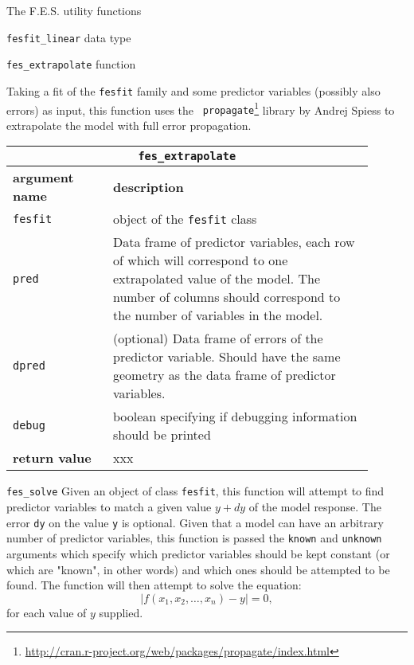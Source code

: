 \documentclass[10pt,a4paper]{article}
\begin{document}
\begin{section}{The F.E.S. utility functions}
\begin{subsection}{ {\tt fesfit\_linear} data type }
\end{subsection}

\begin{subsection}{ {\tt fes\_extrapolate} function }

Taking a fit of the {\tt fesfit} family and some predictor variables (possibly
also errors) as input, this function uses the {\tt
propagate}\footnote{\url{
http://cran.r-project.org/web/packages/propagate/index.html}} library by Andrej
Spiess to extrapolate the model with full error propagation.

{ \centering
\begin{tabular}{|p{0.25\linewidth}|p{0.65\linewidth}|}
\hline
\multicolumn{2}{|c|}{ {\tt fes\_extrapolate} } \\
\hline \hline \textbf{argument name} & \textbf{description} \\
\hline {\tt fesfit} & object of the {\tt fesfit} class \\ 
{\tt pred} & Data frame of predictor variables, each row of which will
correspond to one extrapolated value of the model. The number of columns should
correspond to the number of variables in the model. \\ 
{\tt dpred} & (optional) Data frame of errors of the predictor variable. Should
have the same geometry as the data frame of predictor variables. \\ 
{\tt debug} & boolean specifying if debugging information should be printed \\
\hline \hline
\textbf{return value} & xxx \\
\hline
\end{tabular}
}

\end{subsection}

\begin{subsection}{ {\tt fes\_solve} }
Given an object of class {\tt fesfit}, this function will attempt to find
predictor variables to match a given value $y+dy$ of the model response. The
error {\tt dy} on the value {\tt y} is optional. Given that a model can have an
arbitrary number of predictor variables, this function is passed the {\tt known}
and {\tt unknown} arguments which specify which predictor variables should be
kept constant (or which are "known", in other words) and which ones should be
attempted to be found. The function will then attempt to solve the equation:
\begin{equation}
	| f(x_1, x_2, \ldots , x_n) - y | = 0,
\end{equation}
for each value of $y$ supplied.


\end{subsection}
\end{section}
\end{document}
